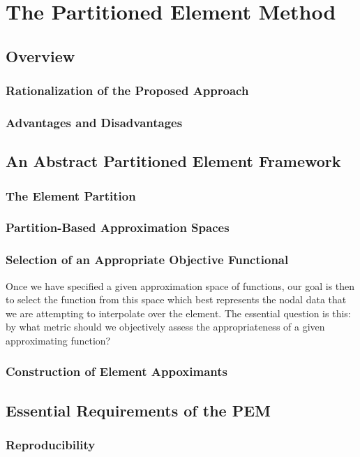 \chapter{The Partitioned Element Method}
%
\section{Overview}
\subsection{Rationalization of the Proposed Approach}
\subsection{Advantages and Disadvantages}

\section{An Abstract Partitioned Element Framework}
\subsection{The Element Partition}
\subsection{Partition-Based Approximation Spaces}
\subsection{Selection of an Appropriate Objective Functional}

Once we have specified a given approximation space of functions, our goal is then to select the function from this space which best represents the nodal data that we are attempting to interpolate over the element. The essential question is this: by what metric should we objectively assess the appropriateness of a given approximating function?

\subsection{Construction of Element Appoximants}

\section{Essential Requirements of the PEM}
\subsection{Reproducibility}

